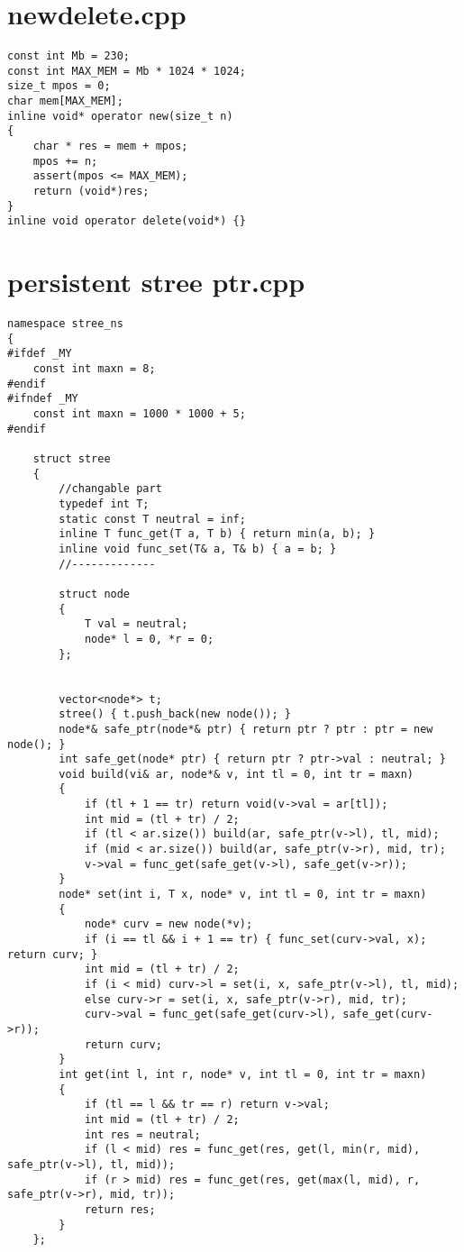 \documentclass[a4paper,12pt]{report}
\begin{document}
\section{newdelete.cpp}
\begin{lstlisting}
const int Mb = 230;
const int MAX_MEM = Mb * 1024 * 1024;
size_t mpos = 0;
char mem[MAX_MEM];
inline void* operator new(size_t n)
{
    char * res = mem + mpos;
    mpos += n;
    assert(mpos <= MAX_MEM);
    return (void*)res;
}
inline void operator delete(void*) {}

\end{lstlisting}


\section{persistent stree ptr.cpp}
\begin{lstlisting}
namespace stree_ns
{
#ifdef _MY
    const int maxn = 8;
#endif
#ifndef _MY
    const int maxn = 1000 * 1000 + 5;
#endif

    struct stree
    {
        //changable part
        typedef int T;
        static const T neutral = inf;
        inline T func_get(T a, T b) { return min(a, b); }
        inline void func_set(T& a, T& b) { a = b; }
        //-------------

        struct node
        {
            T val = neutral;
            node* l = 0, *r = 0;
        };


        vector<node*> t;
        stree() { t.push_back(new node()); }
        node*& safe_ptr(node*& ptr) { return ptr ? ptr : ptr = new node(); }
        int safe_get(node* ptr) { return ptr ? ptr->val : neutral; }
        void build(vi& ar, node*& v, int tl = 0, int tr = maxn)
        {
            if (tl + 1 == tr) return void(v->val = ar[tl]);
            int mid = (tl + tr) / 2;
            if (tl < ar.size()) build(ar, safe_ptr(v->l), tl, mid);
            if (mid < ar.size()) build(ar, safe_ptr(v->r), mid, tr);
            v->val = func_get(safe_get(v->l), safe_get(v->r));
        }
        node* set(int i, T x, node* v, int tl = 0, int tr = maxn)
        {
            node* curv = new node(*v);
            if (i == tl && i + 1 == tr) { func_set(curv->val, x); return curv; }
            int mid = (tl + tr) / 2;
            if (i < mid) curv->l = set(i, x, safe_ptr(v->l), tl, mid);
            else curv->r = set(i, x, safe_ptr(v->r), mid, tr);
            curv->val = func_get(safe_get(curv->l), safe_get(curv->r));
            return curv;
        }
        int get(int l, int r, node* v, int tl = 0, int tr = maxn)
        {
            if (tl == l && tr == r) return v->val;
            int mid = (tl + tr) / 2;
            int res = neutral;
            if (l < mid) res = func_get(res, get(l, min(r, mid), safe_ptr(v->l), tl, mid));
            if (r > mid) res = func_get(res, get(max(l, mid), r, safe_ptr(v->r), mid, tr));
            return res;
        }
    };


\end{lstlisting}
\end{document}
